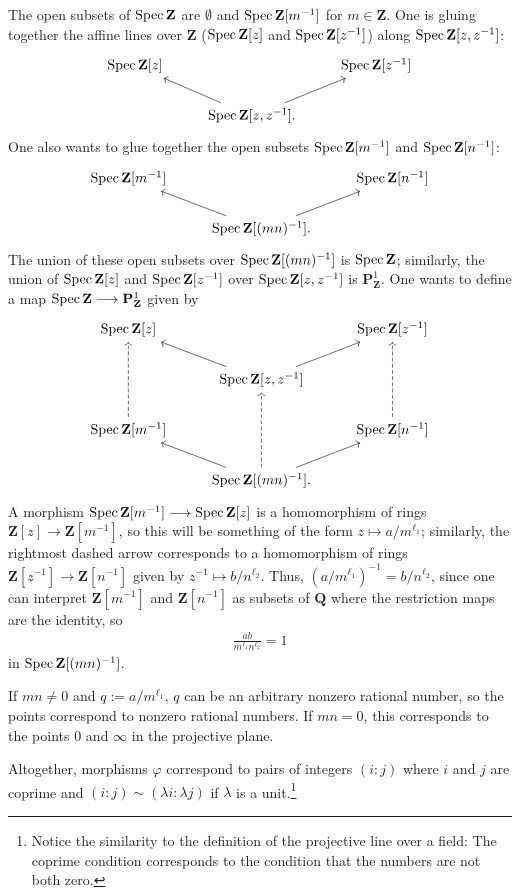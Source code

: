 \documentclass [11 pt, oneside] {article}
\begin{document}
\begin{example}[ ]
The open subsets of $\operatorname{Spec} \mathbf{Z}$ are $\emptyset$ and $\operatorname{Spec} \mathbf{Z}[m^{-1}]$ for $m\in \mathbf{Z}$. One is gluing together the affine lines over $\mathbf{Z}$ ($\operatorname{Spec} \mathbf{Z}[z]$ and $\operatorname{Spec} \mathbf{Z}[z^{-1}]$) along $\operatorname{Spec} \mathbf{Z}[z,z^{-1}]$:
\[
\begin{tikzcd}
	\Spec \mathbf{Z}[z] &&\Spec \mathbf{Z}[z^{-1}]\\
			    &\Spec \mathbf{Z}[z,z^{-1}]. \ar[ru]\ar[lu]
\end{tikzcd}
\]
One also wants to glue together the open subsets $\operatorname{Spec} \mathbf{Z}[m^{-1}]$ and $\operatorname{Spec} \mathbf{Z}[n^{-1}]$:
\[
\begin{tikzcd}
	\Spec \mathbf{Z}[m^{-1}] &&\Spec \mathbf{Z}[n^{-1}]\\
	&\Spec \mathbf{Z}[(mn)^{-1}]. \ar[ru]\ar[lu]
\end{tikzcd}
\]
The union of these open subsets over $\operatorname{Spec} \mathbf{Z}[(mn)^{-1}]$ is $\operatorname{Spec} \mathbf{Z}$; similarly, the union of $\operatorname{Spec} \mathbf{Z}[z]$ and $\operatorname{Spec} \mathbf{Z}[z^{-1}]$ over $\operatorname{Spec} \mathbf{Z}[z,z^{-1}]$ is $\mathbf{P}^1_{\mathbf{Z}}$. One wants to define a map $\operatorname{Spec} \mathbf{Z}\longrightarrow \mathbf{P}^1_{\mathbf{Z}}$ given by
\[
\begin{tikzcd}
	\Spec \mathbf{Z}[z] &&\Spec \mathbf{Z}[z^{-1}]\\
	&\Spec \mathbf{Z}[z,z^{-1}] \ar[ru]\ar[lu]\\
	\Spec \mathbf{Z}[m^{-1}]\ar[uu, dashed]  &&\Spec \mathbf{Z}[n^{-1}]\ar[uu, dashed]\\
	&\Spec \mathbf{Z}[(mn)^{-1}].\ar[uu, dashed] \ar[ru]\ar[lu]
\end{tikzcd}
\]
A morphism $\operatorname{Spec} \mathbf{Z}[m^{-1}]\longrightarrow \operatorname{Spec} \mathbf{Z}[z]$ is a homomorphism of rings $\mathbf{Z}[z]\longrightarrow \mathbf{Z}[m^{-1}]$, so this will be something of the form $z\longmapsto a/m^{\ell_1}$; similarly, the rightmost dashed arrow corresponds to a homomorphism of rings $\mathbf{Z}[z^{-1}] \longrightarrow \mathbf{Z}[n^{-1}]$ given by $z^{-1}\longmapsto b/n^{\ell_2}$. Thus, $(a/m^{\ell_1}) ^{-1}=b/n^{\ell_2}$, since one can interpret $\mathbf{Z}[m^{-1}]$ and $\mathbf{Z}[n^{-1}]$ as subsets of $\mathbf{Q}$ where the restriction maps are the identity, so
\begin{align*}
	\frac{ab}{m^{\ell_1}n^{\ell_2}}=1
\end{align*}
in $\operatorname{Spec} \mathbf{Z}[(mn) ^{-1}]$.

If $mn\ne 0$ and $q:= a/m^{\ell_1}$, $q$ can be an arbitrary nonzero rational number, so the points correspond to nonzero rational numbers. If $mn=0$, this corresponds to the points $0$ and $\infty$ in the projective plane.

Altogether, morphisms $\varphi$ correspond to pairs of integers $(i:j)$ where $i$ and $j$ are coprime and $(i:j)\sim  (\lambda i :\lambda j)$ if $\lambda$ is a unit.\footnote{Notice the similarity to the definition of the projective line over a field: The coprime condition corresponds to the condition that the numbers are not both zero.}
\end{example}
\end{document}
